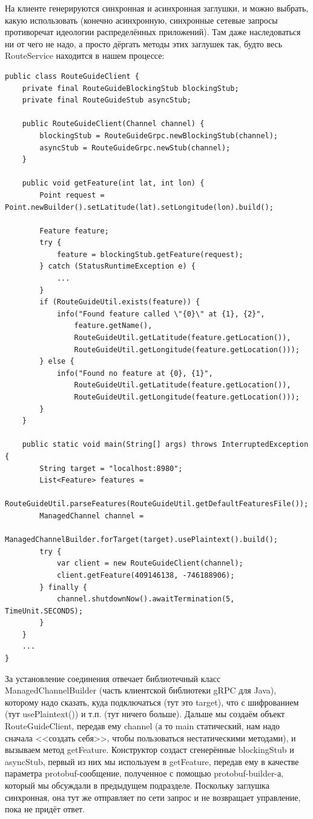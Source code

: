 \documentclass[a5paper]{article}
\begin{document}
На клиенте генерируются синхронная и асинхронная заглушки, и можно выбрать, какую использовать (конечно асинхронную, синхронные сетевые запросы противоречат идеологии распределённых приложений). Там даже наследоваться ни от чего не надо, а просто дёргать методы этих заглушек так, будто весь RouteService находится в нашем процессе:

\begin{verbatim}
public class RouteGuideClient {
    private final RouteGuideBlockingStub blockingStub;
    private final RouteGuideStub asyncStub;

    public RouteGuideClient(Channel channel) {
        blockingStub = RouteGuideGrpc.newBlockingStub(channel);
        asyncStub = RouteGuideGrpc.newStub(channel);
    }

    public void getFeature(int lat, int lon) {
        Point request = Point.newBuilder().setLatitude(lat).setLongitude(lon).build();
        
        Feature feature;
        try {
            feature = blockingStub.getFeature(request);
        } catch (StatusRuntimeException e) {
            ...
        }
        if (RouteGuideUtil.exists(feature)) {
            info("Found feature called \"{0}\" at {1}, {2}",
                feature.getName(),
                RouteGuideUtil.getLatitude(feature.getLocation()),
                RouteGuideUtil.getLongitude(feature.getLocation()));
        } else {
            info("Found no feature at {0}, {1}",
                RouteGuideUtil.getLatitude(feature.getLocation()),
                RouteGuideUtil.getLongitude(feature.getLocation()));
        }
    }

    public static void main(String[] args) throws InterruptedException {
        String target = "localhost:8980";
        List<Feature> features = 
            RouteGuideUtil.parseFeatures(RouteGuideUtil.getDefaultFeaturesFile());
        ManagedChannel channel = 
            ManagedChannelBuilder.forTarget(target).usePlaintext().build();
        try {
            var client = new RouteGuideClient(channel);
            client.getFeature(409146138, -746188906);
        } finally {
            channel.shutdownNow().awaitTermination(5, TimeUnit.SECONDS);
        }
    }
    ...
}
\end{verbatim}

За установление соединения отвечает библиотечный класс ManagedChannelBuilder (часть клиентской библиотеки gRPC для Java), которому надо сказать, куда подключаться (тут это target), что с шифрованием (тут usePlaintext()) и т.п. (тут ничего больше). Дальше мы создаём объект RouteGuideClient, передав ему channel (а то main статический, нам надо сначала <<создать себя>>, чтобы пользоваться нестатическими методами), и вызываем метод getFeature. Конструктор создаст сгенерённые blockingStub и asyncStub, первый из них мы используем в getFeature, передав ему в качестве параметра protobuf-сообщение, полученное с помощью protobuf-builder-а, который мы обсуждали в предыдущем подразделе. Поскольку заглушка синхронная, она тут же отправляет по сети запрос и не возвращает управление, пока не придёт ответ.
\end{document}
